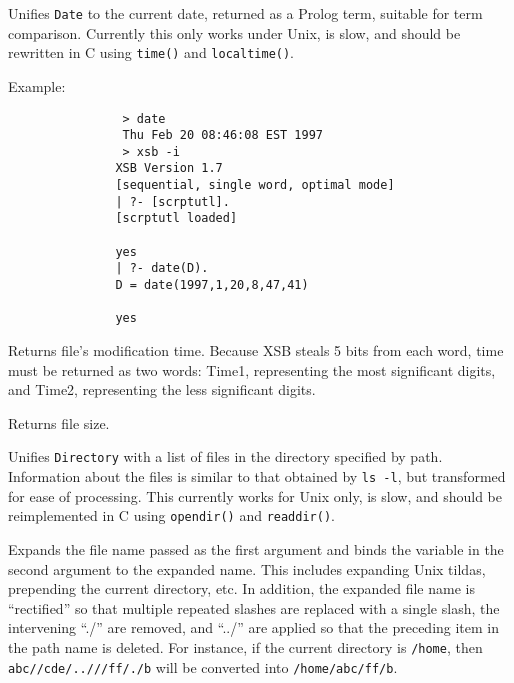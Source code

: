 \begin{description}

Unifies {\tt Date} to the current date, returned as a Prolog term, suitable
for term comparison.  Currently this only works under Unix, is slow, and
should be rewritten in C using {\tt time()} and {\tt localtime()}.

Example:
{\footnotesize
\begin{verbatim}
                > date 
                Thu Feb 20 08:46:08 EST 1997
                > xsb -i
               XSB Version 1.7
               [sequential, single word, optimal mode]
               | ?- [scrptutl].
               [scrptutl loaded]

               yes
               | ?- date(D).
               D = date(1997,1,20,8,47,41)

               yes
\end{verbatim}}


Returns file's modification time. Because 
XSB steals 5 bits from each word, time must be returned as two words:
Time1, representing the most significant digits, and Time2, representing
the less significant digits.


Returns file size.


Unifies {\tt Directory} with a list of files in the directory specified by
path.  Information about the files is similar to that obtained by {\tt ls
  -l}, but transformed for ease of processing.  This currently works for
Unix only, is slow, and should be reimplemented in C using {\tt opendir()}
and {\tt readdir()}.



Expands the file name passed as the first argument and binds the variable
in the second argument to the expanded name. This includes expanding Unix
tildas, prepending the current directory, etc. In addition, the expanded
file name is ``rectified'' so that multiple repeated slashes are replaced
with a single slash, the intervening ``./'' are removed, and ``../'' are
applied so that the preceding item in the path name is deleted. For
instance, if the current directory is {\tt /home}, then {\tt
  abc//cde/..///ff/./b} will be converted into {\tt /home/abc/ff/b}.


\end{description}
